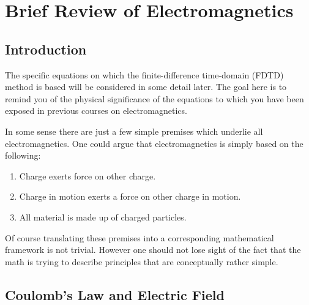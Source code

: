 \chapter{Brief Review of Electromagnetics}


\renewcommand{\thefootnote}{\fnsymbol{footnote}}

\section{Introduction}

The specific equations on which the finite-difference time-domain
(FDTD) method is based will be considered in some detail later.  The
goal here is to remind you of the physical significance of the
equations to which you have been exposed in previous courses on
electromagnetics.

In some sense there are just a few simple premises which underlie all
electromagnetics.  One could argue that electromagnetics is simply
based on the following:
\begin{enumerate}
\item Charge exerts force on other charge.
\item Charge in motion exerts a force on other charge in motion.
\item All material is made up of charged particles.
\end{enumerate}
Of course translating these premises into a corresponding mathematical
framework is not trivial.  However one should not lose sight of the
fact that the math is trying to describe principles that are
conceptually rather simple.

\section{Coulomb's Law and Electric Field}

